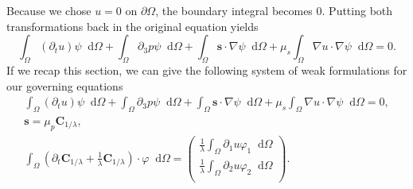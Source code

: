 \documentclass[12pt,a4paper,twoside, open=right]{scrreprt}
\theoremstyle{definition}
\theoremstyle{plain}
\newcommand{\bfs}{\bm{s}}
\newcommand{\bfC}{\bm{C}}
\newcommand{\D}{\mathop{}\!\mathrm{d}}
\begin{document}
Because we chose $u = 0$ on $\partial\Omega$, the boundary integral becomes $0$. Putting both transformations back in the original equation yields
\begin{equation}
    \int_\Omega(\partial_t u)\psi\D\Omega +\int_\Omega\partial_3 p\psi\D\Omega + \int_\Omega\bfs\cdot\nabla\psi\D\Omega+\mu_s\int_\Omega\nabla u\cdot\nabla\psi\D\Omega = 0.
\end{equation}
If we recap this section, we can give the following system of weak formulations for our governing equations
\begin{align}
     \int_\Omega(\partial_t u)\psi\D\Omega +\int_\Omega\partial_3 p\psi\D\Omega + \int_\Omega\bfs\cdot\nabla\psi\D\Omega+\mu_s\int_\Omega\nabla u\cdot\nabla\psi\D\Omega = 0,\\
     \bfs =\mu_p\bfC_{1/\lambda},\\
      \int_\Omega(\partial_t\bfC_{1/\lambda}+\frac{1}{\lambda}\bfC_{1/\lambda})\cdot\varphi\D\Omega = 
     \begin{pmatrix}
     \frac{1}{\lambda}\int_\Omega\partial_1 u\varphi_1\D\Omega\\\frac{1}{\lambda}\int_\Omega\partial_2 u\varphi_2\D\Omega\\
     \end{pmatrix}.
\end{align}
\end{document}
